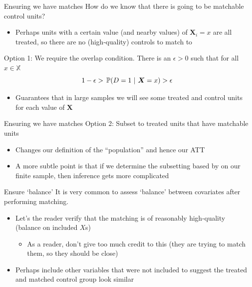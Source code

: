 \documentclass[aspectratio=169,t,11pt,table]{beamer}
\begin{document}
\begin{frame}{Ensuring we have matches}
  How do we know that there is going to be matchable control units?
  \begin{itemize}
    \item Perhaps units with a certain value (and nearby values) of $\bm{X}_i = x$ are all treated, so there are no (high-quality) controls to match to
  \end{itemize}

  \pause
  \bigskip
  Option 1: We require the \alert{overlap} condition. There is an $\epsilon > 0$ such that for all $x \in \mathbb{X}$
  $$
    1 - \epsilon > \prob{D = 1}{\bm{X} = x} > \epsilon
  $$
  \begin{itemize}
    \item Guarantees that in large samples we will see some treated and control units for each value of $\bm{X}$
  \end{itemize}
\end{frame}

\begin{frame}{Ensuring we have matches}
  Option 2: Subset to treated units that have matchable units
  \begin{itemize}
    \item Changes our definition of the ``population'' and hence our ATT
    
    \item A more subtle point is that if we determine the subsetting based by on our finite sample, then inference gets more complicated
  \end{itemize}
\end{frame}

\begin{frame}{Ensure `balance'}
  It is very common to assess `balance' between covariates after performing matching. 
  \begin{itemize}
    \item Let's the reader verify that the matching is of reasonably high-quality (balance on included $X$s)
    \begin{itemize}
      \item As a reader, don't give too much credit to this (they are trying to match them, so they should be close)
    \end{itemize}
    
    \item Perhaps include other variables that were not included to suggest the treated and matched control group look similar
  \end{itemize}
\end{frame}
\end{document}
